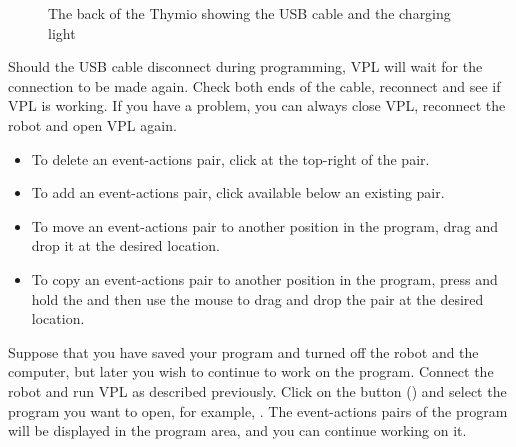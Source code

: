 
\begin{figure}
\begin{center}
\caption{The back of the Thymio showing the USB cable and the
 charging light}\label{fig.back}
\end{center}
\end{figure}

Should the USB cable disconnect during programming, VPL will wait for
the connection to be made again. Check both ends of the cable, reconnect
and see if VPL is working. If you have a problem, you can always close
VPL, reconnect the robot and open VPL again.

\newpage


\begin{itemize}

\item To delete an event-actions pair, click  at the top-right
of the pair.

\item To add an event-actions pair, click  available below
an existing pair.

\item To move an event-actions pair to another position in the program,
drag and drop it at the desired location.

\item To copy an event-actions pair to another position in the program,
press and hold the  and then use the mouse to drag and drop the
pair at the desired location.\label{p.copy-pairs}

\end{itemize}



Suppose that you have saved your program and turned off the robot and
the computer, but later you wish to continue to work on the program.
Connect the robot and run VPL as described previously. Click on the
button  () and select the program you want to open, for
example, . The event-actions pairs of the program will
be displayed in the program area, and you can continue working on it.

\bigskip

